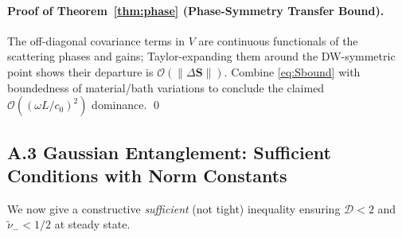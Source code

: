\documentclass[11pt]{article}
\begin{document}
\paragraph{Proof of Theorem~\ref{thm:phase} (Phase-Symmetry Transfer Bound).}
The off-diagonal covariance terms in $V$ are continuous functionals of the scattering phases and gains; Taylor-expanding them around the DW-symmetric point shows their departure is $\mathcal O(\|\Delta \mathbf S\|)$. Combine \eqref{eq:Sbound} with boundedness of material/bath variations to conclude the claimed $\mathcal O((\omega L/c_0)^2)$ dominance. \qed

\subsection*{A.3 Gaussian Entanglement: Sufficient Conditions with Norm Constants}
We now give a constructive \emph{sufficient} (not tight) inequality ensuring $\mathcal D<2$ and $\tilde\nu_-<1/2$ at steady state.
\end{document}
